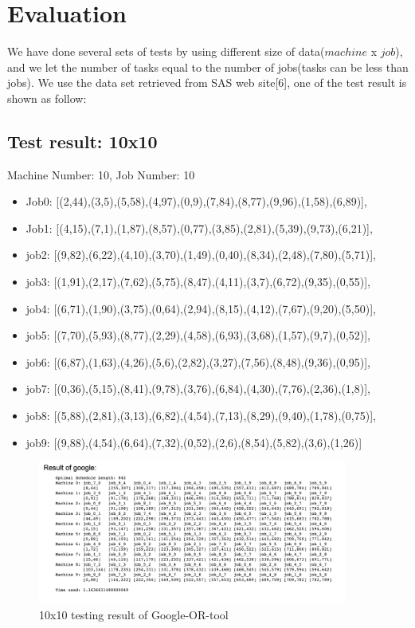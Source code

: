 \section*{Evaluation}
We have done several sets of tests by using different size of data($machine$ x $job$), and we let the number of tasks equal to the number of jobs(tasks can be less than jobs). We use the data set retrieved from SAS web site[6], one of the test result is shown as follow:\\
\subsection*{Test result: 10x10}
Machine Number: 10,  Job Number: 10
\begin{itemize}
 
\item Job0: [(2,44),(3,5),(5,58),(4,97),(0,9),(7,84),(8,77),(9,96),(1,58),(6,89)],  

\item Job1: [(4,15),(7,1),(1,87),(8,57),(0,77),(3,85),(2,81),(5,39),(9,73),(6,21)],  

\item job2: [(9,82),(6,22),(4,10),(3,70),(1,49),(0,40),(8,34),(2,48),(7,80),(5,71)], 

\item job3: [(1,91),(2,17),(7,62),(5,75),(8,47),(4,11),(3,7),(6,72),(9,35),(0,55)], 

\item job4: [(6,71),(1,90),(3,75),(0,64),(2,94),(8,15),(4,12),(7,67),(9,20),(5,50)], 

\item job5: [(7,70),(5,93),(8,77),(2,29),(4,58),(6,93),(3,68),(1,57),(9,7),(0,52)],   

\item job6: [(6,87),(1,63),(4,26),(5,6),(2,82),(3,27),(7,56),(8,48),(9,36),(0,95)], 

\item job7: [(0,36),(5,15),(8,41),(9,78),(3,76),(6,84),(4,30),(7,76),(2,36),(1,8)], 

\item job8: [(5,88),(2,81),(3,13),(6,82),(4,54),(7,13),(8,29),(9,40),(1,78),(0,75)], 

\item job9: [(9,88),(4,54),(6,64),(7,32),(0,52),(2,6),(8,54),(5,82),(3,6),(1,26)]   

\end{itemize}

\begin{figure}[H]
\centering
\includegraphics[width=4in]{img/google.png}
\caption{10x10 testing result of Google-OR-tool}
\end{figure}


